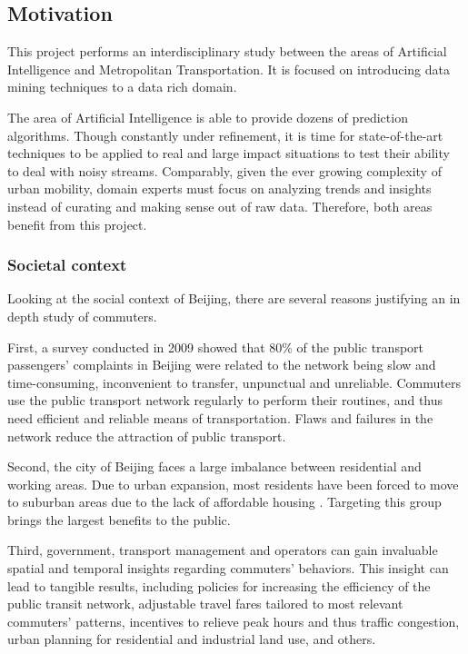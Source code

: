 \documentclass{article}
\begin{document}
\subsection{Motivation}
This project performs an interdisciplinary study between the areas of Artificial Intelligence and Metropolitan Transportation. It is focused on introducing data mining techniques to a data rich domain. 

The area of Artificial Intelligence is able to provide dozens of prediction algorithms. Though constantly under refinement, it is time for state-of-the-art techniques to be applied to real and large impact situations to test their ability to deal with noisy streams. Comparably, given the ever growing complexity of urban mobility, domain experts must focus on analyzing trends and insights instead of curating and making sense out of raw data. Therefore, both areas benefit from this project.

\subsubsection{Societal context}
Looking at the social context of Beijing, there are several reasons justifying an in depth study of commuters. 

First, a survey conducted in 2009 showed that 80\% of the public transport passengers' complaints in Beijing were related to the network being slow and time-consuming, inconvenient to transfer, unpunctual and unreliable. Commuters use the public transport network regularly to perform their routines, and thus need efficient and reliable means of transportation. Flaws and failures in the network reduce the attraction of public transport. \cite{beijing2009research}

Second, the city of Beijing faces a large imbalance between residential and working areas. Due to urban expansion, most residents have been forced to move to suburban areas due to the lack of affordable housing \cite{zhou2014commuting}. Targeting this group brings the largest benefits to the public.  

Third, government, transport management and operators can gain invaluable spatial and temporal insights regarding commuters' behaviors. This insight can lead to tangible results, including policies for increasing the efficiency of the public transit network, adjustable travel fares tailored to most relevant commuters' patterns, incentives to relieve peak hours and thus traffic congestion, urban planning for residential and industrial land use, and others.
\end{document}
